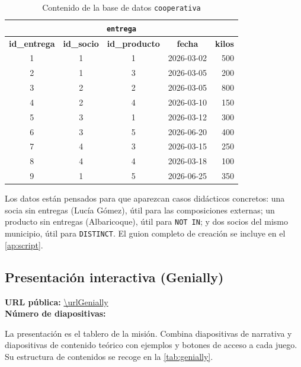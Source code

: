 \documentclass[11pt,a4paper]{article}
\begin{document}
\begin{table}[H]
\vspace{0.4cm}
\begin{tabular}{@{}ccccr@{}}
\toprule
\multicolumn{5}{c}{\texttt{entrega}} \\
\midrule
\textbf{id\_entrega} & \textbf{id\_socio} & \textbf{id\_producto} & \textbf{fecha} & \textbf{kilos} \\
1 & 1 & 1 & 2026-03-02 & 500 \\
2 & 1 & 3 & 2026-03-05 & 200 \\
3 & 2 & 2 & 2026-03-05 & 800 \\
4 & 2 & 4 & 2026-03-10 & 150 \\
5 & 3 & 1 & 2026-03-12 & 300 \\
6 & 3 & 5 & 2026-06-20 & 400 \\
7 & 4 & 3 & 2026-03-15 & 250 \\
8 & 4 & 4 & 2026-03-18 & 100 \\
9 & 1 & 5 & 2026-06-25 & 350 \\
\bottomrule
\end{tabular}
\caption{Contenido de la base de datos \texttt{cooperativa}}
\label{tab:datos}
\end{table}

Los datos están pensados para que aparezcan casos didácticos concretos: una socia sin
entregas (Lucía Gómez), útil para las composiciones externas; un producto sin entregas
(Albaricoque), útil para \texttt{NOT IN}; y dos socios del mismo municipio, útil para
\texttt{DISTINCT}. El guion completo de creación se incluye en el
\autoref{ap:script}.

\subsection{Presentación interactiva (Genially)}
\label{sec:genially}

\begin{nota}
\textbf{URL pública:} \url{\urlGenially}\\
\textbf{Número de diapositivas:} \numDiapositivas
\end{nota}

La presentación es el tablero de la misión. Combina diapositivas de narrativa y
diapositivas de contenido teórico con ejemplos y botones de acceso a cada juego. Su estructura de
contenidos se recoge en la \autoref{tab:genially}.
\end{document}
